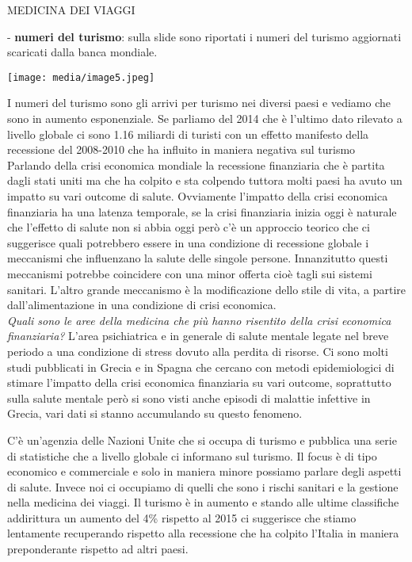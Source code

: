 \documentclass[]{article}
\begin{document}
MEDICINA DEI VIAGGI

- \textbf{numeri del turismo}: sulla slide sono riportati i numeri del
turismo aggiornati scaricati dalla banca mondiale.

\texttt{[image: media/image5.jpeg]}

I numeri del turismo sono gli arrivi per turismo nei diversi paesi e
vediamo che sono in aumento esponenziale. Se parliamo del 2014 che è
l'ultimo dato rilevato a livello globale ci sono 1.16 miliardi di
turisti con un effetto manifesto della recessione del 2008-2010 che ha
influito in maniera negativa sul turismo\\
Parlando della crisi economica mondiale la recessione finanziaria che è
partita dagli stati uniti ma che ha colpito e sta colpendo tuttora molti
paesi ha avuto un impatto su vari outcome di salute. Ovviamente
l'impatto della crisi economica finanziaria ha una latenza temporale, se
la crisi finanziaria inizia oggi è naturale che l'effetto di salute non
si abbia oggi però c'è un approccio teorico che ci suggerisce quali
potrebbero essere in una condizione di recessione globale i meccanismi
che influenzano la salute delle singole persone. Innanzitutto questi
meccanismi potrebbe coincidere con una minor offerta cioè tagli sui
sistemi sanitari. L'altro grande meccanismo è la modificazione dello
stile di vita, a partire dall'alimentazione in una condizione di crisi
economica.\\
\emph{Quali sono le aree della medicina che più hanno risentito della
crisi economica finanziaria?} L'area psichiatrica e in generale di
salute mentale legate nel breve periodo a una condizione di stress
dovuto alla perdita di risorse. Ci sono molti studi pubblicati in Grecia
e in Spagna che cercano con metodi epidemiologici di stimare l'impatto
della crisi economica finanziaria su vari outcome, soprattutto sulla
salute mentale però si sono visti anche episodi di malattie infettive in
Grecia, vari dati si stanno accumulando su questo fenomeno.

C'è un'agenzia delle Nazioni Unite che si occupa di turismo e pubblica
una serie di statistiche che a livello globale ci informano sul turismo.
Il focus è di tipo economico e commerciale e solo in maniera minore
possiamo parlare degli aspetti di salute. Invece noi ci occupiamo di
quelli che sono i rischi sanitari e la gestione nella medicina dei
viaggi. Il turismo è in aumento e stando alle ultime classifiche
addirittura un aumento del 4\% rispetto al 2015 ci suggerisce che stiamo
lentamente recuperando rispetto alla recessione che ha colpito l'Italia
in maniera preponderante rispetto ad altri paesi.
\end{document}
